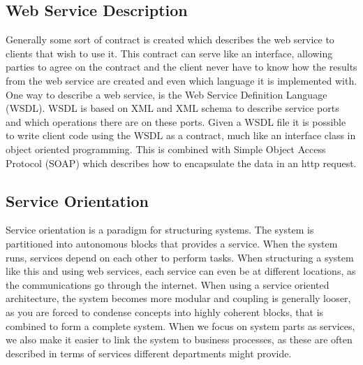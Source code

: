 \subsection{Web Service Description}
Generally some sort of contract is created which describes the web service to clients that wish to use it. This contract can serve like an interface, allowing parties to agree on the contract and the client never have to know how the results from the web service are created and even which language it is implemented with. One way to describe a web service, is the Web Service Definition Language (WSDL). WSDL is based on XML and XML schema to describe service ports and which operations there are on these ports. Given a WSDL file it is possible to write client code using the WSDL as a contract, much like an interface class in object oriented programming. This is combined with Simple Object Access Protocol (SOAP) which describes how to encapsulate the data in an http request.


\subsection{Service Orientation}
Service orientation is a paradigm for structuring systems. The system is partitioned into autonomous blocks that provides a service. When the system runs, services depend on each other to perform tasks. When structuring a system like this and using web services, each service can even be at different locations, as the communications go through the internet. When using a service oriented architecture, the system becomes more modular and coupling is generally looser, as you are forced to condense concepts into highly coherent blocks, that is combined to form a complete system. When we focus on system parts as services, we also make it easier to link the system to business processes, as these are often described in terms of services different departments might provide.

